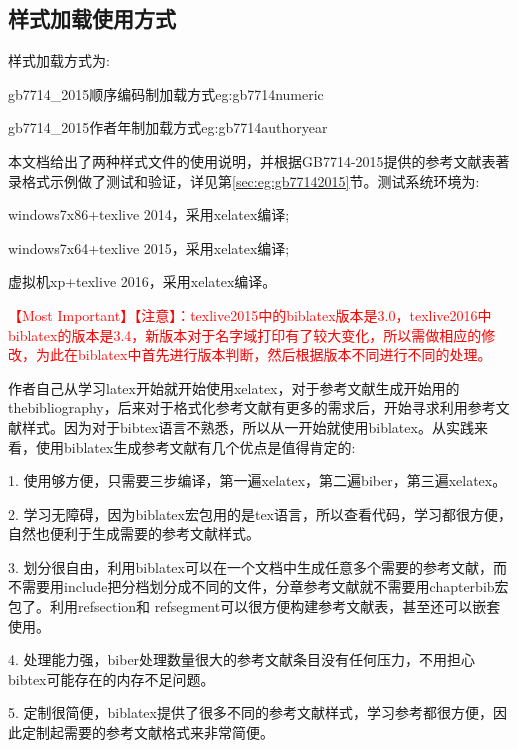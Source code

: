 \documentclass[11pt]{article} %
\begin{document}
\subsection{样式加载使用方式}
样式加载方式为:

\begin{codetex}{gb7714\_2015顺序编码制加载方式}{eg:gb7714numeric}
\usepackage[backend=biber,style=gb7714_2015]{biblatex}
\end{codetex}

\begin{codetex}{gb7714\_2015作者年制加载方式}{eg:gb7714authoryear}
\usepackage[backend=biber,style=gb7714_2015ay]{biblatex}
\end{codetex}

本文档给出了两种样式文件的使用说明，并根据GB7714-2015提供的参考文献表著录格式示例做了测试和验证，详见第\ref{sec:eg:gb77142015}节。测试系统环境为:

windows7x86+texlive 2014，采用xelatex编译;

windows7x64+texlive 2015，采用xelatex编译;

虚拟机xp+texlive 2016，采用xelatex编译。

\textcolor{red}{\HandRight \heiti 【Most Important】【注意】：texlive2015中的biblatex版本是3.0，texlive2016中biblatex的版本是3.4，新版本对于名字域打印有了较大变化，所以需做相应的修改，为此在biblatex中首先进行版本判断，然后根据版本不同进行不同的处理。}

作者自己从学习latex开始就开始使用xelatex，对于参考文献生成开始用的thebibliography，后来对于格式化参考文献有更多的需求后，开始寻求利用参考文献样式。因为对于bibtex语言不熟悉，所以从一开始就使用biblatex。从实践来看，使用biblatex生成参考文献有几个优点是值得肯定的:

1. 使用够方便，只需要三步编译，第一遍xelatex，第二遍biber，第三遍xelatex。

2. 学习无障碍，因为biblatex宏包用的是tex语言，所以查看代码，学习都很方便，自然也便利于生成需要的参考文献样式。

3. 划分很自由，利用biblatex可以在一个文档中生成任意多个需要的参考文献，而不需要用include把分档划分成不同的文件，分章参考文献就不需要用chapterbib宏包了。利用refsection和 refsegment可以很方便构建参考文献表，甚至还可以嵌套使用。

4. 处理能力强，biber处理数量很大的参考文献条目没有任何压力，不用担心bibtex可能存在的内存不足问题。

5. 定制很简便，biblatex提供了很多不同的参考文献样式，学习参考都很方便，因此定制起需要的参考文献格式来非常简便。
\end{document}
